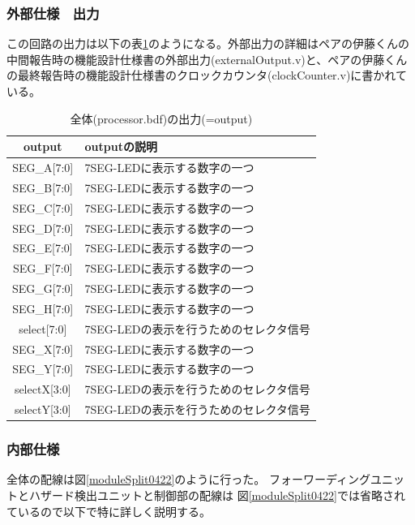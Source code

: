 \documentclass[a4j,titlepage]{jarticle}
\begin{document}
\subsubsection{外部仕様　出力}
この回路の出力は以下の表\ref{zentaiprocessorO}のようになる。外部出力の詳細はペアの伊藤くんの中間報告時の機能設計仕様書の外部出力(externalOutput.v)と、ペアの伊藤くんの最終報告時の機能設計仕様書のクロックカウンタ(clockCounter.v)に書かれている。
\begin{table}[H]
    \caption{全体(processor.bdf)の出力(=output)}
    \label{zentaiprocessorO}
    \begin{center}
    \begin {tabularx}{150mm}{|c|X|} \hline
         output & outputの説明 \\ \hline \hline
         SEG\_A[7:0] & 7SEG-LEDに表示する数字の一つ\\ \hline
         SEG\_B[7:0] & 7SEG-LEDに表示する数字の一つ\\ \hline %
         SEG\_C[7:0] & 7SEG-LEDに表示する数字の一つ\\ \hline
         SEG\_D[7:0] & 7SEG-LEDに表示する数字の一つ\\ \hline
         SEG\_E[7:0] & 7SEG-LEDに表示する数字の一つ\\ \hline
         SEG\_F[7:0] & 7SEG-LEDに表示する数字の一つ\\ \hline
         SEG\_G[7:0] & 7SEG-LEDに表示する数字の一つ\\ \hline
         SEG\_H[7:0] & 7SEG-LEDに表示する数字の一つ\\ \hline
         select[7:0] & 7SEG-LEDの表示を行うためのセレクタ信号\\ \hline
	SEG\_X[7:0] & 7SEG-LEDに表示する数字の一つ\\ \hline
        SEG\_Y[7:0] & 7SEG-LEDに表示する数字の一つ\\ \hline
        selectX[3:0] & 7SEG-LEDの表示を行うためのセレクタ信号\\ \hline
	selectY[3:0] & 7SEG-LEDの表示を行うためのセレクタ信号\\ \hline
    \end {tabularx}
    \end{center}
\end{table}

\subsubsection{内部仕様}
全体の配線は図\ref{moduleSplit0422}のように行った。
フォーワーディングユニットとハザード検出ユニットと制御部の配線は
図\ref{moduleSplit0422}では省略されているので以下で特に詳しく説明する。
\end{document}
